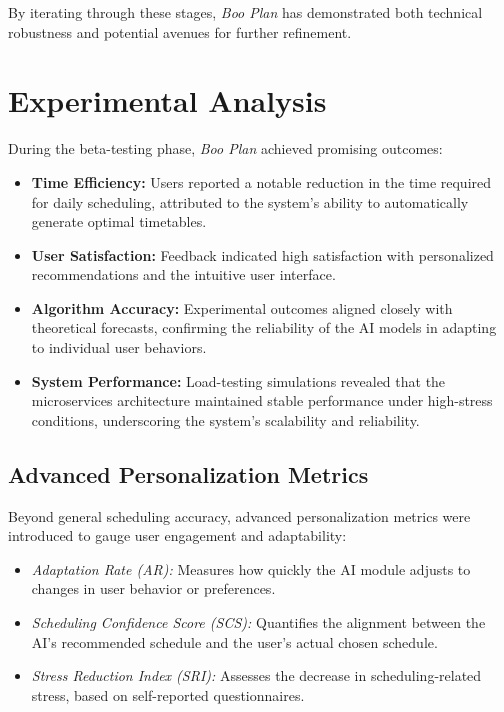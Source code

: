 \documentclass[14pt, english]{gost-7-32} %
\begin{document}
By iterating through these stages, \textit{Boo Plan} has demonstrated both technical robustness and potential avenues for further refinement.

\section{Experimental Analysis}

During the beta-testing phase, \textit{Boo Plan} achieved promising outcomes:

\begin{itemize}
    \item \textbf{Time Efficiency:} Users reported a notable reduction in the time required for daily scheduling, attributed to the system's ability to automatically generate optimal timetables.
    \item \textbf{User Satisfaction:} Feedback indicated high satisfaction with personalized recommendations and the intuitive user interface.
    \item \textbf{Algorithm Accuracy:} Experimental outcomes aligned closely with theoretical forecasts, confirming the reliability of the AI models in adapting to individual user behaviors.
    \item \textbf{System Performance:} Load-testing simulations revealed that the microservices architecture maintained stable performance under high-stress conditions, underscoring the system's scalability and reliability.
\end{itemize}

\subsection{Advanced Personalization Metrics}

Beyond general scheduling accuracy, advanced personalization metrics were introduced to gauge user engagement and adaptability:
\begin{itemize}
    \item \textit{Adaptation Rate (AR):} Measures how quickly the AI module adjusts to changes in user behavior or preferences.
    \item \textit{Scheduling Confidence Score (SCS):} Quantifies the alignment between the AI's recommended schedule and the user's actual chosen schedule.
    \item \textit{Stress Reduction Index (SRI):} Assesses the decrease in scheduling-related stress, based on self-reported questionnaires.
\end{itemize}
\end{document}
